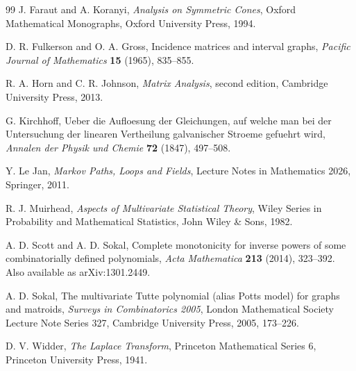 \documentclass[preprint,12pt,authoryear]{elsarticle}
\numberwithin{equation}{section}
\theoremstyle{definition}
\theoremstyle{remark}
\newcommand{\1}{\mathbf{1}}
\begin{document}
\begin{thebibliography}{99}
J. Faraut and A. Koranyi,
\emph{Analysis on Symmetric Cones},
Oxford Mathematical Monographs, Oxford University Press, 1994.

D. R. Fulkerson and O. A. Gross,
Incidence matrices and interval graphs,
\emph{Pacific Journal of Mathematics} \textbf{15} (1965), 835--855.

R. A. Horn and C. R. Johnson,
\emph{Matrix Analysis},
second edition, Cambridge University Press, 2013.

G. Kirchhoff,
Ueber die Aufloesung der Gleichungen, auf welche man bei der Untersuchung der linearen Vertheilung galvanischer Stroeme gefuehrt wird,
\emph{Annalen der Physik und Chemie} \textbf{72} (1847), 497--508.

Y. Le Jan,
\emph{Markov Paths, Loops and Fields},
Lecture Notes in Mathematics 2026, Springer, 2011.

R. J. Muirhead,
\emph{Aspects of Multivariate Statistical Theory},
Wiley Series in Probability and Mathematical Statistics, John Wiley \& Sons, 1982.

A. D. Scott and A. D. Sokal,
Complete monotonicity for inverse powers of some combinatorially defined polynomials,
\emph{Acta Mathematica} \textbf{213} (2014), 323--392.
Also available as arXiv:1301.2449.

A. D. Sokal,
The multivariate Tutte polynomial (alias Potts model) for graphs and matroids,
\emph{Surveys in Combinatorics 2005}, London Mathematical Society Lecture Note Series 327, Cambridge University Press, 2005, 173--226.

D. V. Widder,
\emph{The Laplace Transform},
Princeton Mathematical Series 6, Princeton University Press, 1941.

\end{thebibliography}
\end{document}
